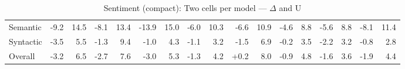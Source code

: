 \begin{table}[h]
{\begin{tabular}{lrrrrrrrrrrrrrrrr}
Semantic & \cellcolor{red!18} -9.2 & \cellcolor{blue!37} 14.5 & \cellcolor{red!16} -8.1 & \cellcolor{blue!35} 13.4 & \cellcolor{red!20} -13.9 & \cellcolor{blue!39} 15.0 & \cellcolor{red!12} -6.0 & \cellcolor{blue!27} 10.3 & \cellcolor{red!13} -6.6 & \cellcolor{blue!28} 10.9 & \cellcolor{red!9} -4.6 & \cellcolor{blue!23} 8.8 & \cellcolor{red!11} -5.6 & \cellcolor{blue!23} 8.8 & \cellcolor{red!16} -8.1 & \cellcolor{blue!29} 11.4 \\
Syntactic & \cellcolor{red!6} -3.5 & \cellcolor{blue!14} 5.5 & \cellcolor{red!2} -1.3 & \cellcolor{blue!24} 9.4 & \cellcolor{red!1} -1.0 & \cellcolor{blue!11} 4.3 & \cellcolor{red!2} -1.1 & \cellcolor{blue!8} 3.2 & \cellcolor{red!2} -1.5 & \cellcolor{blue!18} 6.9 & \cellcolor{red!0} -0.2 & \cellcolor{blue!9} 3.5 & \cellcolor{red!4} -2.2 & \cellcolor{blue!8} 3.2 & \cellcolor{red!1} -0.8 & \cellcolor{blue!7} 2.8 \\
Overall & \cellcolor{red!6} -3.2 & \cellcolor{blue!17} 6.5 & \cellcolor{red!5} -2.7 & \cellcolor{blue!20} 7.6 & \cellcolor{red!5} -3.0 & \cellcolor{blue!14} 5.3 & \cellcolor{red!2} -1.3 & \cellcolor{blue!11} 4.2 & \cellcolor{green!0} +0.2 & \cellcolor{blue!21} 8.0 & \cellcolor{red!1} -0.9 & \cellcolor{blue!12} 4.8 & \cellcolor{red!3} -1.6 & \cellcolor{blue!9} 3.6 & \cellcolor{red!3} -1.9 & \cellcolor{blue!11} 4.4 \\
\bottomrule
\end{tabular}}
\caption{Sentiment (compact): Two cells per model — $\Delta$ and U}\label{tab:sa_compact_combined_cells}
\end{table}